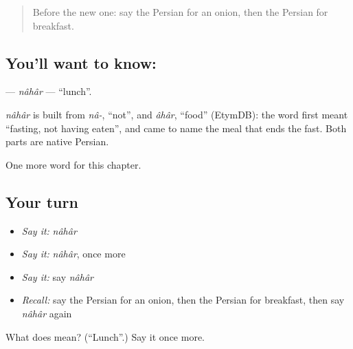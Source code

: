 \label{lesson:FA-C43-nahar}



\begin{quote}
Before the new one: say the Persian for an onion, then the Persian for breakfast.
\end{quote}

\subsection*{You'll want to know: }
\textbf{} — \emph{nâhâr} — \textquotedblleft{}lunch\textquotedblright{}.

\begin{cousinweb}
\emph{nâhâr} is built from \emph{nâ-}, \textquotedblleft{}not\textquotedblright{}, and \emph{âhâr}, \textquotedblleft{}food\textquotedblright{} (EtymDB): the word first meant \textquotedblleft{}fasting, not having eaten\textquotedblright{}, and came to name the meal that ends the fast. Both parts are native Persian.
\end{cousinweb}

\begin{grammarlens}[title={What you've built}]
One more word for this chapter.
\end{grammarlens}

\subsection*{Your turn}
\begin{itemize}
\raggedright
  \item \emph{Say it:} \emph{nâhâr}
  \item \emph{Say it:} \emph{nâhâr}, once more
  \item \emph{Say it:} say \emph{nâhâr}
  \item \emph{Recall:} say the Persian for an onion, then the Persian for breakfast, then say \emph{nâhâr} again
\end{itemize}

\begin{tcolorbox}[breakable,colback=teal!4,colframe=teal!35!black,title={Before you move on}]
What does  mean? (\textquotedblleft{}Lunch\textquotedblright{}.) Say it once more.
\end{tcolorbox}
